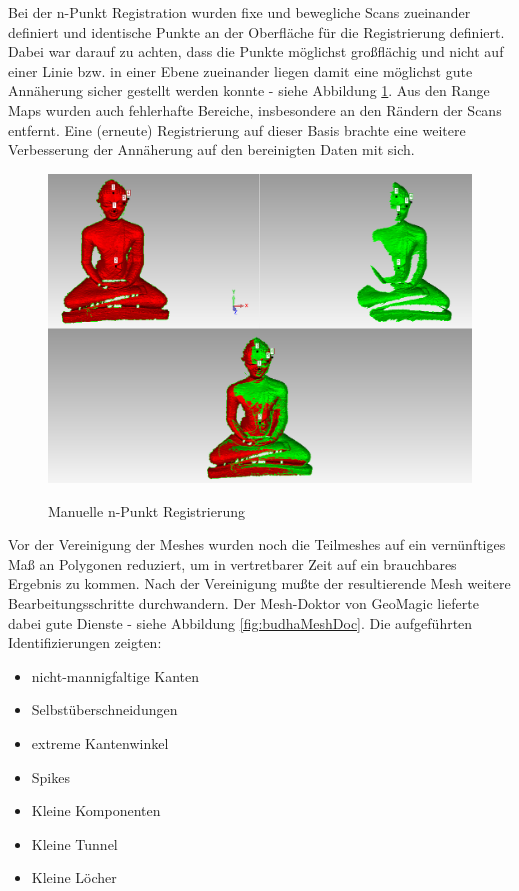 \documentclass[]{article}
\begin{document}
Bei der n-Punkt Registration wurden fixe und bewegliche Scans zueinander definiert und identische Punkte an der Oberfläche für die Registrierung definiert. Dabei war darauf zu achten, dass die Punkte möglichst großflächig und nicht auf einer Linie bzw. in einer Ebene zueinander liegen damit eine möglichst gute Annäherung sicher gestellt werden konnte - siehe Abbildung \ref{fig:budhaManual}. Aus den Range Maps wurden auch fehlerhafte Bereiche, insbesondere an den Rändern der Scans entfernt. Eine (erneute) Registrierung auf dieser Basis brachte eine weitere Verbesserung der Annäherung auf den bereinigten Daten mit sich.

\begin{figure}[H]
\caption{Manuelle n-Punkt Registrierung}
\centering
\includegraphics[scale=0.35]{images/GeoMagicBudhaPictures/Budha_Scans_Aufrecht_manualRegistration_03.PNG}
\label{fig:budhaManual}
\end{figure}
 
Vor der Vereinigung der Meshes wurden noch die Teilmeshes auf ein vernünftiges Maß an Polygonen reduziert, um in vertretbarer Zeit auf ein brauchbares Ergebnis zu kommen.
Nach der Vereinigung mußte der resultierende Mesh weitere Bearbeitungsschritte durchwandern. Der Mesh-Doktor von GeoMagic lieferte dabei gute Dienste - siehe Abbildung \ref{fig:budhaMeshDoc}. Die aufgeführten Identifizierungen zeigten:

\begin{itemize}
\item nicht-mannigfaltige Kanten
\item Selbstüberschneidungen
\item extreme Kantenwinkel
\item Spikes
\item Kleine Komponenten
\item Kleine Tunnel
\item Kleine Löcher
\end{itemize}
\end{document}
